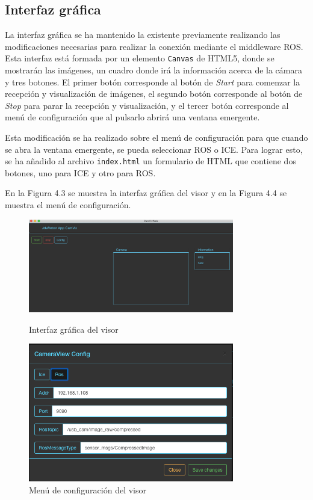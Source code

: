\subsection{Interfaz gráfica}
La interfaz gráfica se ha mantenido la existente previamente realizando las modificaciones necesarias para realizar la conexión mediante el middleware ROS. Esta interfaz está formada por un elemento \texttt{Canvas} de HTML5, donde se mostrarán las imágenes, un cuadro donde irá la información acerca de la cámara y tres botones. El primer botón corresponde al botón de \textit{Start} para comenzar la recepción y visualización de imágenes, el segundo botón corresponde al botón de \textit{Stop} para parar la recepción y visualización, y el tercer botón corresponde al menú de configuración que al pulsarlo abrirá una ventana emergente.

Esta modificación se ha realizado sobre el menú de configuración para que cuando se abra la ventana emergente, se pueda seleccionar ROS o ICE. Para lograr esto, se ha añadido al archivo \texttt{index.html} un formulario de HTML que contiene dos botones, uno para ICE y otro para ROS. 

En la Figura 4.3 se muestra la interfaz gráfica del visor y en la Figura 4.4 se muestra el menú de configuración.

\begin{figure}
\centering
  \begin{minipage}{0.5\textwidth}
    \centering
    \includegraphics[width=0.8\textwidth]{figures/interfazcamviz.png}
    \caption{Interfaz gráfica del visor}
    \label{fig.iterfazcamviz}
  \end{minipage}%
  \hspace{5mm}
  \begin{minipage}{0.5\textwidth}
    \centering
    \includegraphics[width=0.8\textwidth]{figures/configuracioncamviz.png}
    \caption{Menú de configuración del visor}
    \label{fig.configuracioncamviz}
  \end{minipage}
\end{figure}

